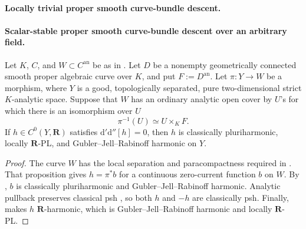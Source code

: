\paragraph{Locally trivial proper smooth curve-bundle descent.}



\paragraph{Scalar-stable proper smooth curve-bundle descent over an
arbitrary field.}



\begin{corollary}
\label{cor:p062-proper-smooth-curve-bundles-over-curves}
Let \(K\), \(C\), and \(W\subset C^{\mathrm{an}}\) be as in
.  Let \(D\) be a nonempty geometrically
connected smooth proper algebraic curve over \(K\), and put \(F:=D^{\mathrm{an}}\).
Let \(\pi:Y\to W\) be a morphism, where \(Y\) is a good, topologically
separated, pure two-dimensional strict \(K\)-analytic space.  Suppose that
\(W\) has an ordinary analytic open cover by \(U\)'s for which there is an
isomorphism over \(U\)
\[
                         \pi^{-1}(U)\simeq U\times_KF.
\]
If \(h\in C^0(Y,\mathbf R)\) satisfies
\(\mathrm d'\mathrm d''[h]=0\), then \(h\) is classically
pluriharmonic, locally \(\mathbf R\)-PL, and Gubler--Jell--Rabinoff
harmonic on \(Y\).
\end{corollary}

\begin{proof}
The curve \(W\) has the local separation and paracompactness required in
.  That proposition gives
\(h=\pi^*b\) for a continuous zero-current function \(b\) on \(W\).
By , \(b\) is classically
pluriharmonic and Gubler--Jell--Rabinoff harmonic.  Analytic pullback
preserves classical psh \cite[Proposition~4.2(6)]{GR25Classical}, so both
\(h\) and \(-h\) are classically psh.  Finally,
 makes \(h\) \(\mathbf R\)-harmonic,
which is Gubler--Jell--Rabinoff harmonic and locally \(\mathbf R\)-PL.
\end{proof}

